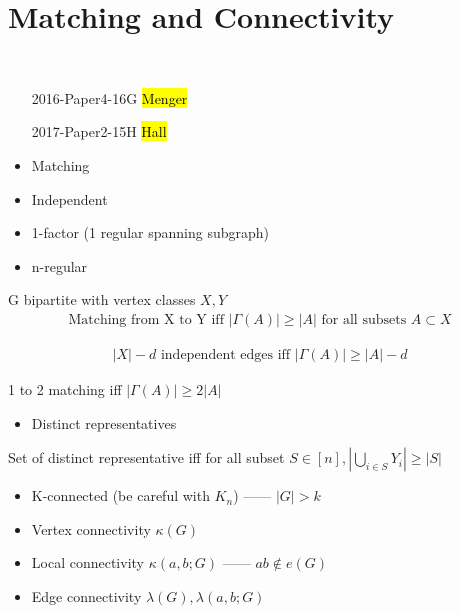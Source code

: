\section{Matching and Connectivity}\label{sec:matching-and-connectivity}

\begin{exam}
    \,
    \begin{enumerate}
        \item[2016-Paper4-16G] \hl{Menger}
        \item[2017-Paper2-15H] \hl{Hall}
    \end{enumerate}
\end{exam}

\begin{itemize}
    \item Matching
    \item Independent
    \item 1-factor (1 regular spanning subgraph)
    \item n-regular
\end{itemize}

\begin{thm}[Hall]
    G bipartite with vertex classes $X, Y$
    \begin{align*}
        \text{Matching from X to Y iff $|\Gamma(A)| \geq |A|$ for all subsets $A \subset X$}
    \end{align*}
\end{thm}

\begin{thm}
    \begin{align*}
        |X| - d \text{ independent edges iff } |\Gamma(A)| \geq |A| - d
    \end{align*}
\end{thm}

\begin{thm}
    1 to 2 matching iff $|\Gamma(A)| \geq 2|A|$
\end{thm}

\begin{itemize}
    \item Distinct representatives
\end{itemize}

\begin{cor}
    Set of distinct representative iff for all subset $S \in [n], |\bigcup_{i \in S}{Y_i}| \geq |S|$
\end{cor}

\begin{itemize}
    \item K-connected (be careful with $K_n$) ------ $|G| > k$
    \item Vertex connectivity $\kappa (G)$
    \item Local connectivity $\kappa(a, b; G)$ ------ $ab \notin e(G)$
    \item Edge connectivity $\lambda(G), \lambda(a, b; G)$
\end{itemize}

